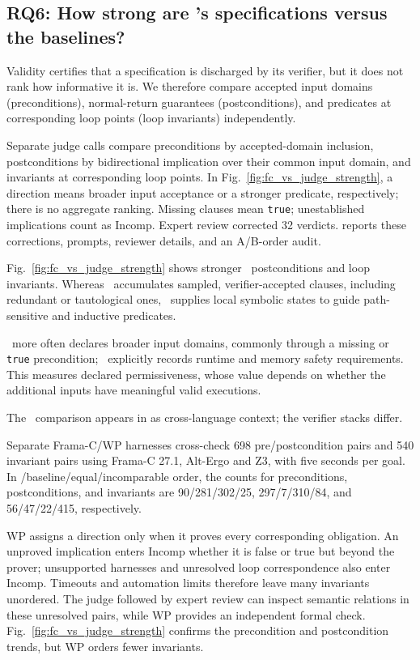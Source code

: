 \subsection{RQ6: How strong are \toolname's specifications versus the baselines?}
\label{subsec:rq6-strength}

{Validity certifies that a specification is discharged by its verifier, but it does not rank how informative it is. We therefore compare accepted input domains (preconditions), normal-return guarantees (postconditions), and predicates at corresponding loop points (loop invariants) independently.}

\smallskip
{}
{Separate judge calls compare preconditions by accepted-domain inclusion, postconditions by bidirectional implication over their common input domain, and invariants at corresponding loop points. In Fig.~\ref{fig:fc_vs_judge_strength}, a direction means broader input acceptance or a stronger predicate, respectively; there is no aggregate ranking. Missing clauses mean \texttt{true}; unestablished implications count as Incomp. Expert review corrected 32 verdicts.  reports these corrections, prompts, reviewer details, and an A/B-order audit.}

{Fig.~\ref{fig:fc_vs_judge_strength} shows stronger \toolname\ postconditions and loop invariants. Whereas \autospec\ accumulates sampled, verifier-accepted clauses, including redundant or tautological ones, \toolname\ supplies local symbolic states to guide path-sensitive and inductive predicates.}

{\autospec\ more often declares broader input domains, commonly through a missing or \texttt{true} precondition; \toolname\ explicitly records runtime and memory safety requirements. This measures declared permissiveness, whose value depends on whether the additional inputs have meaningful valid executions.}

{The \specgen\ comparison appears in  as cross-language context; the verifier stacks differ.}

\smallskip
{}
{Separate Frama-C/WP harnesses cross-check 698 pre/postcondition pairs
and 540 invariant pairs using Frama-C 27.1, Alt-Ergo and Z3, with five
seconds per goal. In \toolname/baseline/equal/incomparable order, the counts
for preconditions, postconditions, and invariants are 90/281/302/25,
297/7/310/84, and 56/47/22/415, respectively.}

{WP assigns a direction only when it proves every corresponding
obligation. An unproved implication enters Incomp whether it is false or true
but beyond the prover; unsupported harnesses and unresolved loop
correspondence also enter Incomp. Timeouts and automation limits therefore
leave many invariants unordered. The judge followed by expert review can
inspect semantic relations in these unresolved pairs, while WP provides an
independent formal check. Fig.~\ref{fig:fc_vs_judge_strength} confirms the
precondition and postcondition trends, but WP orders fewer invariants.}

